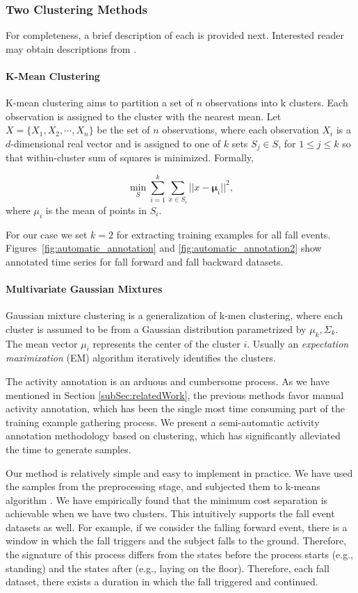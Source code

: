 \documentclass{IEEEtran}
\begin{document}
\subsubsection{Two Clustering Methods } For completeness, a brief description of each is provided next. Interested reader may obtain descriptions from \cite{Bishop06a}.
\paragraph{K-Mean Clustering }
K-mean clustering aims to partition a set of $n$ observations into k clusters. Each observation is assigned to the cluster with the nearest mean. Let  $X = \{X_1, X_2, \cdots, X_n\}$ be the set of $n$ observations, where each observation $X_i$ is a $d$-dimensional real vector and is assigned to one of $k$ sets $S_j \in S$, for $ 1 \leq  j \leq k$ so that within-cluster sum of squares is minimized. Formally,

$$ \min _{S} \sum_{i=1}^{k} \sum_{x \in S_i} || x - \boldsymbol\mu_i ||^2,$$
where $\mu_i$ is the mean of points in $S_i$.

For our case we set $k = 2$ for extracting  training examples for all fall events. Figures~\ref{fig:automatic_annotation} and \ref{fig:automatic_annotation2} show annotated time series for fall forward and fall backward datasets.


\paragraph{Multivariate Gaussian Mixtures}

Gaussian mixture clustering is a generalization of k-men clustering, where each cluster is assumed to be from a Gaussian distribution parametrized by $\mu_k, \Sigma_k$. The mean vector $\mu_i$ represents the center of the cluster $i$. Usually an \emph{expectation maximixation} (EM) algorithm iteratively identifies the clusters.
 

The activity annotation is an arduous and cumbersome process. As we have mentioned in 
Section \ref{subSec:relatedWork}, the previous methods favor manual activity annotation, 
which has been the single most time consuming part of the training example gathering 
process. We present a semi-automatic activity annotation methodology based on 
clustering, which has 
significantly alleviated the time to generate samples. 

Our method is relatively simple and easy to implement in practice. We have used the 
samples from the preprocessing stage, and subjected them to k-means algorithm 
\cite{Bishop06a}. We have empirically found that the minimum cost separation is 
achievable when we have two clusters. This intuitively supports the fall event datasets 
as well. For 
example, if we consider the falling forward event, there is a window in which the fall 
triggers and the subject falls to the ground. Therefore, the signature of this process 
differs from the states before the process starts (e.g., standing) and the states after 
(e.g., laying on the floor). Therefore, each fall dataset, there exists a duration in 
which the fall triggered and continued.
\end{document}
